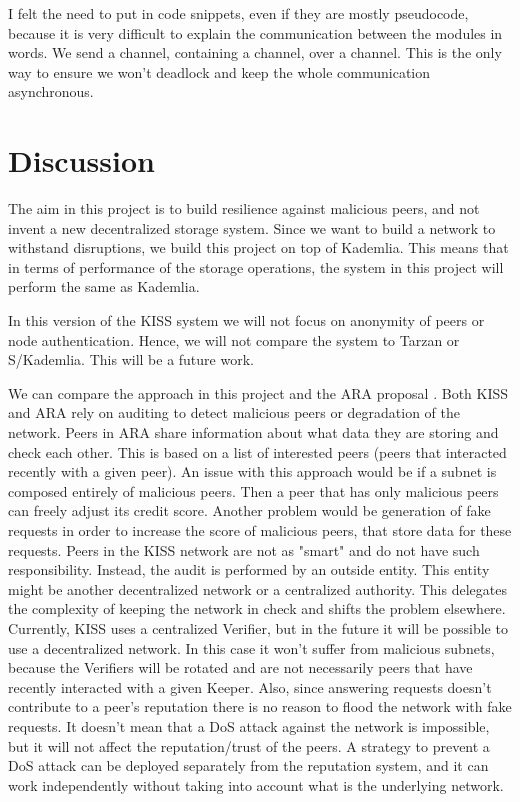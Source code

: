 \documentclass[ twoside,openright,titlepage,numbers=noenddot,headinclude,%
                footinclude=true,cleardoublepage=empty,abstractoff, %
                BCOR=5mm,paper=a4,fontsize=11pt,%
                ngerman,american,%
                ]{scrreprt}
\begin{document}
I felt the need to put in code snippets, even if they are mostly pseudocode,
because it is very difficult to explain the communication between the modules in words.
We send a channel, containing a channel, over a channel.
This is the only way to ensure we won't deadlock and keep the whole communication asynchronous.



\chapter{Discussion}
\label{cha:discussion}

The aim in this project is to build resilience against malicious peers,
and not invent a new decentralized storage system.
Since we want to build a network to withstand disruptions, we build this project on top of Kademlia.
This means that in terms of performance of the storage operations, the system in this project will perform the same
as Kademlia.

In this version of the KISS system we will not focus on anonymity of peers or node authentication.
Hence, we will not compare the system to Tarzan or S/Kademlia.
This will be a future work.

We can compare the approach in this project and the ARA proposal \cite{ara}.
Both KISS and ARA rely on auditing to detect malicious peers or degradation of the network.
Peers in ARA share information about what data they are storing and check each other.
This is based on a list of interested peers (peers that interacted recently with a given peer).
An issue with this approach would be if a subnet is composed entirely of malicious peers.
Then a peer that has only malicious peers can freely adjust its credit score.
Another problem would be generation of fake requests in order to increase the score of malicious peers,
that store data for these requests.
Peers in the KISS network are not as "smart" and do not have such responsibility.
Instead, the audit is performed by an outside entity.
This entity might be another decentralized network or a centralized authority.
This delegates the complexity of keeping the network in check and shifts the problem elsewhere.
Currently, KISS uses a centralized Verifier, but in the future it will be possible to use a decentralized network.
In this case it won't suffer from malicious subnets, because the Verifiers will be rotated and are not necessarily
peers that have recently interacted with a given Keeper.
Also, since answering requests doesn't contribute to a peer's reputation there is no reason to flood the
network with fake requests.
It doesn't mean that a DoS attack against the network is impossible,
but it will not affect the reputation/trust of the peers.
A strategy to prevent a DoS attack can be deployed separately from the reputation system,
and it can work independently without taking into account what is the underlying network.
\end{document}
